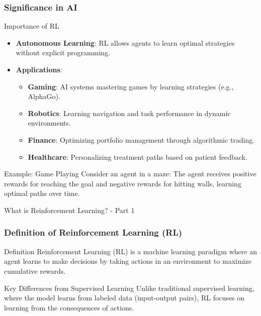 \documentclass[aspectratio=169]{beamer}
\begin{document}
\begin{frame}[fragile]
    \frametitle{Significance in AI}
    \begin{block}{Importance of RL}
        \begin{itemize}
            \item \textbf{Autonomous Learning}: RL allows agents to learn optimal strategies without explicit programming.
            \item \textbf{Applications}:
                \begin{itemize}
                    \item \textbf{Gaming}: AI systems mastering games by learning strategies (e.g., AlphaGo).
                    \item \textbf{Robotics}: Learning navigation and task performance in dynamic environments.
                    \item \textbf{Finance}: Optimizing portfolio management through algorithmic trading.
                    \item \textbf{Healthcare}: Personalizing treatment paths based on patient feedback.
                \end{itemize}
        \end{itemize}
    \end{block}
    
    \begin{block}{Example: Game Playing}
        Consider an agent in a maze:
        The agent receives positive rewards for reaching the goal and negative rewards for hitting walls, learning optimal paths over time.
    \end{block}
\end{frame}

\begin{frame}[fragile]{What is Reinforcement Learning? - Part 1}
    \frametitle{Definition of Reinforcement Learning (RL)}
    \begin{block}{Definition}
        Reinforcement Learning (RL) is a machine learning paradigm where an agent learns to make decisions by taking actions in an environment to maximize cumulative rewards.
    \end{block}
    \begin{block}{Key Differences from Supervised Learning}
        Unlike traditional supervised learning, where the model learns from labeled data (input-output pairs), RL focuses on learning from the consequences of actions.
    \end{block}
\end{frame}
\end{document}
